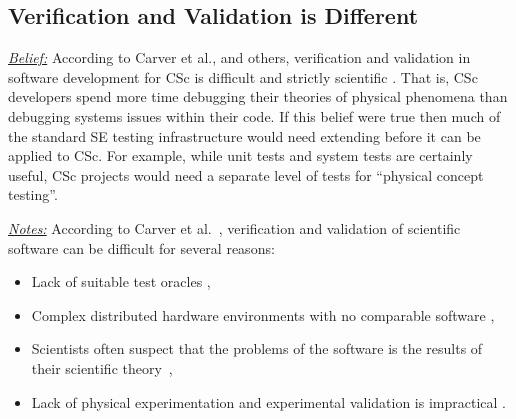 \documentclass[conference,10pt]{IEEEtran}
\newcommand{\bi}{\begin{itemize}}
\newcommand{\ei}{\end{itemize}}
\newcommand{\fig}[1]{Figure~\ref{fig:#1}}
\newenvironment{RQ}{\vspace{1mm}\begin{tcolorbox}[enhanced,width=3.4in,size=fbox,colback=red!5!white,drop shadow southeast,sharp corners]}{\end{tcolorbox}}
\begin{document}






 


\subsection{Verification and Validation is Different}\label{vv}
\noindent \textit{\underline{Belief:}} 
According to Carver et al., and others, 
verification and validation in software development for CSc is difficult and strictly scientific \cite{carver07_environment, kanewala13_testing, carver06_hpc, Prabhu11_cssurvey, basili08_hpc}.
That is, CSc developers spend more time debugging their theories
of physical phenomena than debugging systems issues within their code.
If this belief were true then much of the standard SE testing
infrastructure would need extending before it can be applied to CSc. For example,
while unit tests and system tests are certainly useful, CSc projects would need a separate level of tests for ``physical concept testing''. 

\noindent \textit{\underline{Notes:}} 
According to Carver et al.~\cite{carver07_environment},
verification and validation of scientific software can be difficult for several reasons:
\bi
  \item Lack of suitable test oracles \cite{kanewala13_testing},
  \item Complex distributed hardware environments with no comparable software \cite{basili08_hpc},
  \item Scientists often suspect that the problems of the software is the results of their scientific theory~\cite{faulk09_secs},
  \item Lack of physical experimentation and experimental validation is impractical \cite{carver07_environment}. 
\ei
\end{document}
